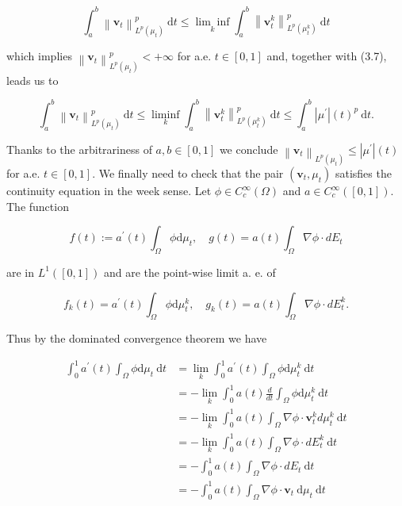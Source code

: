 \documentclass[10pt]{article}
\begin{document}
\[
\int_{a}^{b}\left\|\mathbf{v}_{t}\right\|_{L^{p}\left(\mu_{t}\right)}^{p} \mathrm{~d} t \leq \underset{k}{\lim \inf } \int_{a}^{b}\left\|\mathbf{v}_{t}^{k}\right\|_{L^{p}\left(\mu_{t}^{k}\right)}^{p} \mathrm{~d} t
\]

which implies \(\left\|\mathbf{v}_{t}\right\|_{L^{p}\left(\mu_{t}\right)}^{p}<+\infty\) for a.e. \(t \in[0,1]\) and, together with (3.7), leads us to

\[
\int_{a}^{b}\left\|\mathbf{v}_{t}\right\|_{L^{p}\left(\mu_{t}\right)}^{p} \mathrm{~d} t \leq \liminf _{k} \int_{a}^{b}\left\|\mathbf{v}_{t}^{k}\right\|_{L^{p}\left(\mu_{t}^{k}\right)}^{p} \mathrm{~d} t \leq \int_{a}^{b}\left|\mu^{\prime}\right|(t)^{p} \mathrm{~d} t .
\]

Thanks to the arbitrariness of \(a, b \in[0,1]\) we conclude \(\left\|\mathbf{v}_{t}\right\|_{L^{p}\left(\mu_{t}\right)} \leq\left|\mu^{\prime}\right|(t)\) for a.e. \(t \in[0,1]\). We finally need to check that the pair \(\left(\mathbf{v}_{t}, \mu_{t}\right)\) satisfies the continuity equation in the week sense. Let \(\phi \in C_{c}^{\infty}(\Omega)\) and \(a \in C_{c}^{\infty}([0,1])\). The function

\[
f(t):=a^{\prime}(t) \int_{\Omega} \phi \mathrm{d} \mu_{t}, \quad g(t)=a(t) \int_{\Omega} \nabla \phi \cdot d E_{t}
\]

are in \(L^{1}([0,1])\) and are the point-wise limit a. e. of

\[
f_{k}(t)=a^{\prime}(t) \int_{\Omega} \phi \mathrm{d} \mu_{t}^{k}, \quad g_{k}(t)=a(t) \int_{\Omega} \nabla \phi \cdot d E_{t}^{k} .
\]

Thus by the dominated convergence theorem we have

\[
\begin{aligned}
\int_{0}^{1} a^{\prime}(t) \int_{\Omega} \phi \mathrm{d} \mu_{t} \mathrm{~d} t & =\lim _{k} \int_{0}^{1} a^{\prime}(t) \int_{\Omega} \phi \mathrm{d} \mu_{t}^{k} \mathrm{~d} t \\
& =-\lim _{k} \int_{0}^{1} a(t) \frac{d}{d t} \int_{\Omega} \phi \mathrm{d} \mu_{t}^{k} \mathrm{~d} t \\
& =-\lim _{k} \int_{0}^{1} a(t) \int_{\Omega} \nabla \phi \cdot \mathbf{v}_{t}^{k} d \mu_{t}^{k} \mathrm{~d} t \\
& =-\lim _{k} \int_{0}^{1} a(t) \int_{\Omega} \nabla \phi \cdot d E_{t}^{k} \mathrm{~d} t \\
& =-\int_{0}^{1} a(t) \int_{\Omega} \nabla \phi \cdot d E_{t} \mathrm{~d} t \\
& =-\int_{0}^{1} a(t) \int_{\Omega} \nabla \phi \cdot \mathbf{v}_{t} \mathrm{~d} \mu_{t} \mathrm{~d} t
\end{aligned}
\]
\end{document}
